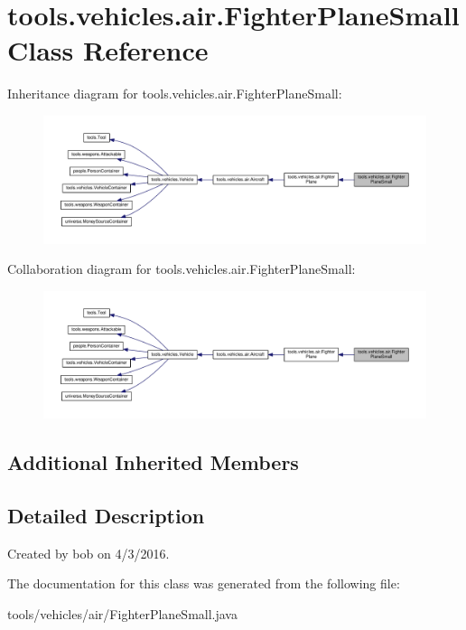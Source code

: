 \hypertarget{classtools_1_1vehicles_1_1air_1_1_fighter_plane_small}{}\section{tools.\+vehicles.\+air.\+Fighter\+Plane\+Small Class Reference}
\label{classtools_1_1vehicles_1_1air_1_1_fighter_plane_small}


Inheritance diagram for tools.\+vehicles.\+air.\+Fighter\+Plane\+Small\+:\nopagebreak
\begin{figure}[H]
\begin{center}
\leavevmode
\includegraphics[width=350pt]{classtools_1_1vehicles_1_1air_1_1_fighter_plane_small__inherit__graph}
\end{center}
\end{figure}


Collaboration diagram for tools.\+vehicles.\+air.\+Fighter\+Plane\+Small\+:\nopagebreak
\begin{figure}[H]
\begin{center}
\leavevmode
\includegraphics[width=350pt]{classtools_1_1vehicles_1_1air_1_1_fighter_plane_small__coll__graph}
\end{center}
\end{figure}
\subsection*{Additional Inherited Members}


\subsection{Detailed Description}
Created by bob on 4/3/2016. 

The documentation for this class was generated from the following file\+:\begin{DoxyCompactItemize}
\item 
tools/vehicles/air/Fighter\+Plane\+Small.\+java\end{DoxyCompactItemize}

